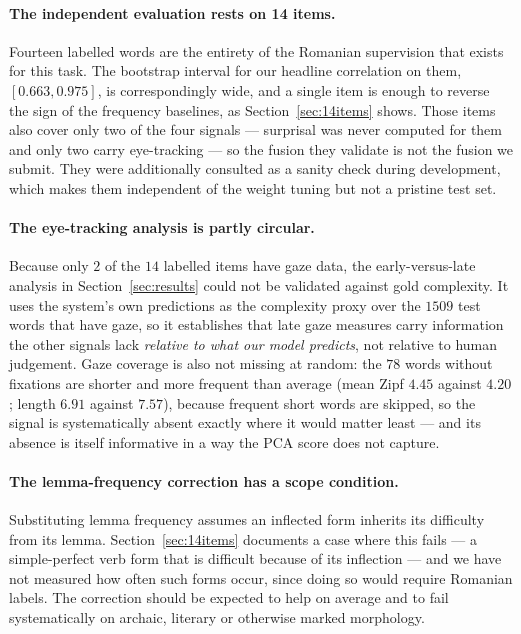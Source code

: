 \documentclass[11pt]{article}
\begin{document}
\paragraph{The independent evaluation rests on 14 items.}
Fourteen labelled words are the entirety of the Romanian supervision
that exists for this task. The bootstrap interval for our headline
correlation on them, $[0.663, 0.975]$, is correspondingly wide, and a
single item is enough to reverse the sign of the frequency baselines,
as Section~\ref{sec:14items} shows. Those items also cover only two of
the four signals --- surprisal was never computed for them and only two
carry eye-tracking --- so the fusion they validate is not the fusion we
submit. They were additionally consulted as a sanity check during
development, which makes them independent of the weight tuning but not
a pristine test set.

\paragraph{The eye-tracking analysis is partly circular.}
Because only $2$ of the $14$ labelled items have gaze data, the
early-versus-late analysis in Section~\ref{sec:results} could not be
validated against gold complexity. It uses the system's own predictions
as the complexity proxy over the $1509$ test words that have gaze, so
it establishes that late gaze measures carry information the other
signals lack \emph{relative to what our model predicts}, not relative
to human judgement. Gaze coverage is also not missing at random: the
$78$ words without fixations are shorter and more frequent than
average (mean Zipf $4.45$ against $4.20$; length $6.91$ against
$7.57$), because frequent short words are skipped, so the signal is
systematically absent exactly where it would matter least --- and its
absence is itself informative in a way the PCA score does not capture.

\paragraph{The lemma-frequency correction has a scope condition.}
Substituting lemma frequency assumes an inflected form inherits its
difficulty from its lemma. Section~\ref{sec:14items} documents a case
where this fails --- a simple-perfect verb form that is difficult
because of its inflection --- and we have not measured how often such
forms occur, since doing so would require Romanian labels. The
correction should be expected to help on average and to fail
systematically on archaic, literary or otherwise marked morphology.
\end{document}
